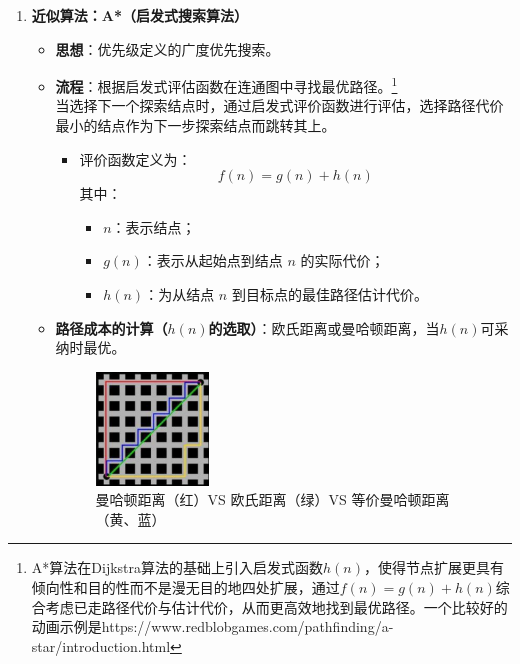 \documentclass[../main.tex]{subfiles}
\begin{document}
\begin{enumerate}
    \item \textbf{近似算法：A*（启发式搜索算法）}\label{subsubsec:Astar}
    \begin{itemize}
        \item \textbf{思想}：优先级定义的广度优先搜索。
        \item \textbf{流程}：根据启发式评估函数在连通图中寻找最优路径。\footnote{A*算法在Dijkstra算法的基础上引入启发式函数$h(n)$，使得节点扩展更具有倾向性和目的性而不是漫无目的地四处扩展，通过$f(n)=g(n)+h(n)$综合考虑已走路径代价与估计代价，从而更高效地找到最优路径。一个比较好的动画示例是https://www.redblobgames.com/pathfinding/a-star/introduction.html}              
        \\ {\small\kaishu 当选择下一个探索结点时，通过启发式评价函数进行评估，选择路径代价最小的结点作为下一步探索结点而跳转其上。}
            \begin{itemize}
                \item 评价函数定义为：
                \[
                f(n) = g(n) + h(n)
                \]
                其中：
                \begin{itemize}
                    \item \( n \)：表示结点；
                    \item \( g(n) \)：表示从起始点到结点 \( n \) 的实际代价；
                    \item \( h(n) \)：为从结点 \( n \) 到目标点的最佳路径估计代价。
                \end{itemize}
            \end{itemize}
        \item \textbf{路径成本的计算（$h(n)$的选取）}：欧氏距离或曼哈顿距离，当$h(n)$可采纳时最优。
        \begin{figure}[H]
            \centering
            \includegraphics[width=0.3\textwidth]{images/hn.png}
            \caption{曼哈顿距离（红）VS 欧氏距离（绿）VS 等价曼哈顿距离（黄、蓝）}
        \end{figure}
    \end{itemize}


\end{enumerate}
\end{document}
